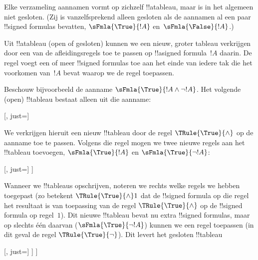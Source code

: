 \documentclass[openany]{memoir}
\begin{document}
\begin{ex}
  Elke verzameling aannamen vormt op zichzelf !!a{tableau}, maar is in
  het algemeen niet gesloten. (Zij is vanzelfsprekend alleen gesloten
  als de aannamen al een paar !!{signed formula}s bevatten,
  $\sFmla{\True}{!A}$ en~$\sFmla{\False}{!A}$.)

  Uit !!a{tableau} (open of gesloten) kunnen we een nieuw, groter
  tableau verkrijgen door een van de afleidingsregels toe te passen op
  !!a{signed formula}~$!A$ daarin. De regel voegt een of meer
  !!{signed formula}s toe aan het einde van iedere tak die het voorkomen
  van~$!A$ bevat waarop we de regel toepassen.

  Beschouw bijvoorbeeld de aanname $\sFmla{\True}{!A \land \lnot
    !A}$. Het volgende (open) !!{tableau} bestaat alleen uit die
  aanname:
  \begin{center}
    \begin{tableau}{}
      [, just=\TAss]
    \end{tableau}{}
  \end{center}
  We verkrijgen hieruit een nieuw !!{tableau} door de regel
  $\TRule{\True}{\land}$ op de aanname toe te passen. Volgens die regel
  mogen we twee nieuwe regels aan het !!{tableau} toevoegen,
  $\sFmla{\True}{!A}$ en $\sFmla{\True}{\lnot !A}$:
  \begin{center}
    \begin{tableau}{}
      [, just=\TAss
        [\sFmla{\True}{\formula{A}}, just={\TRule{\True}{\land}[1]},
          [\sFmla{\True}{\lnot \formula{A}}, just={\TRule{\True}{\land}[1]}
          ]
        ]
      ]
    \end{tableau}{}
  \end{center}
  Wanneer we !!{tableau}s opschrijven, noteren we rechts welke regels we
  hebben toegepast (zo betekent $\TRule{\True}{\land} 1$ dat de
  !!{signed formula} op die regel het resultaat is van toepassing van
  de regel $\TRule{\True}{\land}$ op de !!{signed formula} op
  regel~$1$). Dit nieuwe !!{tableau} bevat nu extra
  !!{signed formula}s, maar op slechts één daarvan
  ($\sFmla{\True}{\lnot !A}$) kunnen we een regel toepassen (in dit
  geval de regel $\TRule{\True}{\lnot}$). Dit levert het gesloten
  !!{tableau}
  \begin{center}
    \begin{tableau}{}
      [, just=\TAss
        [\sFmla{\True}{\formula{A}}, just={\TRule{\True}{\land}[1]}
          [\sFmla{\True}{\lnot \formula{A}}, just={\TRule{\True}{\land}[1]}
            [\sFmla{\False}{\formula{A}}, just={\TRule{\True}{\lnot}[3]}, close]
          ]
        ]
      ]
    \end{tableau}{}
  \end{center}
\end{ex}
\endgroup
\end{document}
